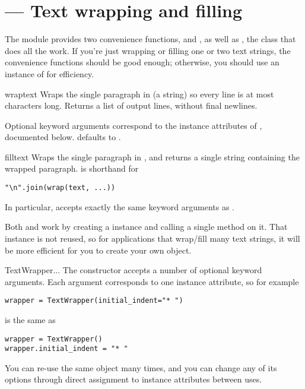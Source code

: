 \section{ ---
         Text wrapping and filling}



The  module provides two convenience functions,
 and , as well as
, the class that does all the work.  If you're just
wrapping or filling one or two text strings, the convenience functions
should be good enough; otherwise, you should use an instance of
 for efficiency.

\begin{funcdesc}{wrap}{text}
Wraps the single paragraph in  (a string) so every line is at
most  characters long.  Returns a list of output lines,
without final newlines.

Optional keyword arguments correspond to the instance attributes of
, documented below.   defaults to
.
\end{funcdesc}

\begin{funcdesc}{fill}{text}
Wraps the single paragraph in , and returns a single string
containing the wrapped paragraph.   is shorthand for
\begin{verbatim}
"\n".join(wrap(text, ...))
\end{verbatim}

In particular,  accepts exactly the same keyword
arguments as .
\end{funcdesc}

Both  and  work by creating a
 instance and calling a single method on it.  That
instance is not reused, so for applications that wrap/fill many text
strings, it will be more efficient for you to create your own
 object.

\begin{classdesc}{TextWrapper}{...}
The  constructor accepts a number of optional
keyword arguments.  Each argument corresponds to one instance attribute,
so for example
\begin{verbatim}
wrapper = TextWrapper(initial_indent="* ")
\end{verbatim}
is the same as
\begin{verbatim}
wrapper = TextWrapper()
wrapper.initial_indent = "* "
\end{verbatim}

You can re-use the same  object many times, and you
can change any of its options through direct assignment to instance
attributes between uses.
\end{classdesc}

